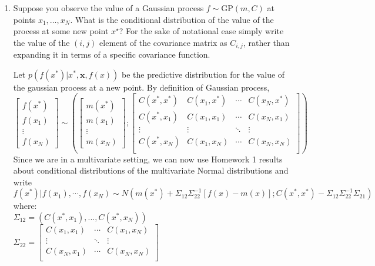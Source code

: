 \documentclass{homework}
\newcommand{\1}{\mathbf{1}}
\begin{document}
\begin{enumerate}[label=(\Alph*)]
\item Suppose you observe the value of a Gaussian process $f \sim \mbox{GP}(m,C)$ at points $x_1, \ldots, x_N$.  What is the conditional distribution of the value of the process at some new point $x^{\star}$?  For the sake of notational ease simply write the value of the $(i,j)$ element of the covariance matrix as $C_{i,j}$, rather than expanding it in terms of a specific covariance function.


Let  $p(f (x^{*})|x^{*} , \textbf{x}, f(x))$ be the predictive distribution for the value of the gaussian process at a new point.  By definition of Gaussian process,\\
$  \begin{bmatrix} f(x^*) \\  f(x_1)   \\ \vdots \\ f(x_N) \end{bmatrix}
\sim \left( \begin{bmatrix} m(x^*) \\ m(x_1) \\ \vdots \\ m(x_N) \end{bmatrix}
; \begin{bmatrix} 
C(x^*,x^*) & C(x_1,x^*) & \cdots & C(x_N,x^*) \\ 
C(x^*,x_1) & C(x_1,x_1) & \cdots & C(x_N,x_1) \\ 
\vdots & \vdots & \ddots & \vdots \\
C(x^*,x_N) & C(x_1,x_N) & \cdots & C(x_N,x_N) \\ 
\end{bmatrix} \right)$\\

Since we are in a multivariate setting, we can now use Homework 1 results about 
conditional distributions of the multivariate Normal distributions and write
$$f(x^*) | f(x_1 ), \cdots , f(x_N ) \sim N (m(x^*) + \Sigma_{12} \Sigma_{22}^{-1} [f(x) - m(x)]; C(x^*, x^*) - \Sigma_{12} \Sigma_{22}^{-1} \Sigma_{21} ) $$
where: \\ 
$\Sigma_{12} = (C(x^*,x_1),...,C(x^*,x_N))$\\
$ \Sigma_{22} = \begin{bmatrix} C(x_1,x_1) & \cdots & C(x_1,x_N) \\
\vdots & \ddots & \vdots \\
C(x_N,x_1) & \cdots & C(x_N,x_N)\\
\end{bmatrix}$




\end{enumerate}
\end{document}
